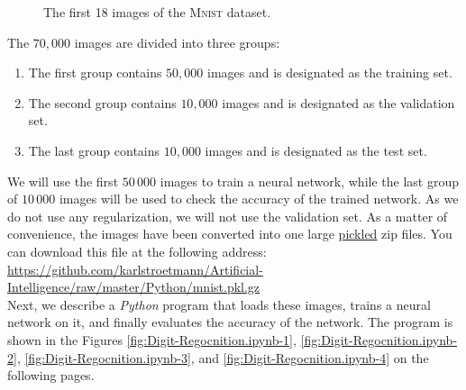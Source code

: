 \begin{figure}[h]
  \begin{center}
  \end{center}
  \caption{The first 18 images of the \textsc{Mnist} dataset.}
  \label{fig:mnist_imgs}
\end{figure}
The $70,000$ images are divided into three groups:
\begin{enumerate}
\item The first group contains $50,000$ images and is designated as the training set.
\item The second group contains $10,000$ images and is designated as the validation set.
\item The last group contains $10,000$ images and is designated as the test set.
\end{enumerate}
We will use the first $50\,000$ images to train a neural network, while the last group of $10\,000$ images
will be used to check the accuracy of the trained network.  As we do not use any regularization, we will not
use the validation set.
As a matter of convenience, the images have been
converted into one large \href{https://docs.python.org/3.7/library/pickle.html}{pickled}  zip
files.  You can download this file at the following address: 
\\[0.2cm]
\hspace*{1.0cm}
\href{https://github.com/karlstroetmann/Artificial-Intelligence/raw/master/Python/mnist.pkl.gz}{https://github.com/karlstroetmann/Artificial-Intelligence/raw/master/Python/mnist.pkl.gz}
\\[0.2cm]
Next, we describe a \textsl{Python} program that loads these images, trains a neural network on it, and
finally evaluates the accuracy of the network.  The program is shown in the Figures
\ref{fig:Digit-Regocnition.ipynb-1}, \ref{fig:Digit-Regocnition.ipynb-2}, \ref{fig:Digit-Regocnition.ipynb-3},
and \ref{fig:Digit-Regocnition.ipynb-4} on the following pages.


